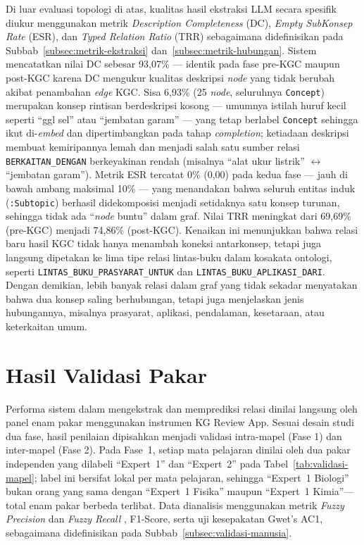 \documentclass[../../thesis]{subfiles}
\begin{document}
\begin{enumerate}
  Di luar evaluasi topologi di atas, kualitas hasil ekstraksi LLM secara
  spesifik diukur menggunakan metrik \textit{Description Completeness} (DC),
  \textit{Empty SubKonsep Rate} (ESR), dan
  \textit{Typed Relation Ratio} (TRR) sebagaimana didefinisikan pada
  Subbab~\ref{subsec:metrik-ekstraksi} dan~\ref{subsec:metrik-hubungan}.
  Sistem mencatatkan nilai DC sebesar 93{,}07\% --- identik pada
  fase pre-KGC maupun post-KGC karena DC mengukur kualitas deskripsi \textit{node} yang
  tidak berubah akibat penambahan \textit{edge} KGC. Sisa 6{,}93\% (25
\textit{node}, seluruhnya \texttt{Concept}) merupakan konsep rintisan
berdeskripsi kosong --- umumnya istilah huruf kecil seperti ``ggl sel'' atau
``jembatan garam'' --- yang tetap berlabel \texttt{Concept} sehingga ikut
di-\textit{embed} dan dipertimbangkan pada tahap \textit{completion}; ketiadaan
deskripsi membuat kemiripannya lemah dan menjadi salah satu sumber relasi
\texttt{BERKAITAN\_DENGAN} berkeyakinan rendah (misalnya ``alat ukur listrik''
$\leftrightarrow$ ``jembatan garam''). Metrik ESR tercatat 0\%
  (0,00) pada kedua fase --- jauh di bawah ambang maksimal 10\% --- yang
  menandakan bahwa seluruh entitas induk (\texttt{:Subtopic}) berhasil
  didekomposisi menjadi setidaknya satu konsep turunan, sehingga tidak ada
  ``\textit{node} buntu'' dalam graf. Nilai TRR meningkat dari
  69{,}69\% (pre-KGC) menjadi 74{,}86\% (post-KGC). Kenaikan ini menunjukkan
  bahwa relasi baru hasil KGC tidak hanya menambah koneksi antarkonsep, tetapi
  juga langsung dipetakan ke lima tipe relasi lintas-buku dalam kosakata
  ontologi, seperti \texttt{LINTAS\_BUKU\_PRASYARAT\_UNTUK} dan
  \texttt{LINTAS\_BUKU\_APLIKASI\_DARI}. Dengan demikian, lebih banyak relasi
  dalam graf yang tidak sekadar menyatakan bahwa dua konsep saling berhubungan,
  tetapi juga menjelaskan jenis hubungannya, misalnya prasyarat, aplikasi,
  pendalaman, kesetaraan, atau keterkaitan umum.
\end{enumerate}

\section{Hasil Validasi Pakar}\label{subsec:validasi-pakar}

Performa sistem dalam mengekstrak dan memprediksi relasi dinilai langsung oleh
panel enam pakar menggunakan instrumen KG Review App. Sesuai desain studi dua
fase, hasil penilaian dipisahkan menjadi validasi intra-mapel (Fase 1) dan
inter-mapel (Fase 2). Pada Fase~1, setiap mata pelajaran dinilai oleh dua
pakar independen yang dilabeli ``Expert~1'' dan ``Expert~2'' pada
Tabel~\ref{tab:validasi-mapel}; label ini bersifat lokal per mata
pelajaran, sehingga ``Expert~1 Biologi'' bukan orang yang sama dengan
``Expert~1 Fisika'' maupun ``Expert~1 Kimia''---total enam pakar berbeda
terlibat. Data dianalisis menggunakan metrik \textit{Fuzzy
Precision} dan \textit{Fuzzy Recall} \parencite{harju_evaluating_2023}, F1-Score,
serta uji kesepakatan Gwet's AC1, sebagaimana didefinisikan pada
Subbab~\ref{subsec:validasi-manusia}.
\end{document}

